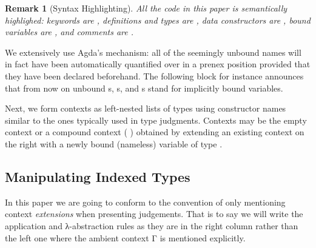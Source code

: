 \documentclass{article}
\newtheorem*{remark}{Remark}
\begin{document}

\begin{remark}[Syntax Highlighting]
  All the code in this paper is semantically highlighed:
  keywords are , definitions and types are ,
  data constructors are , bound variables are
  , and comments are .
\end{remark}

We extensively use Agda's  mechanism: all of
the seemingly unbound names will in fact have been automatically
quantified over in a prenex position provided that they
have been declared beforehand.
%
The following block for instance announces that from now
on unbound s, s, and s stand for implicitly bound
 variables.


Next, we form contexts as left-nested lists of types using
constructor names similar to the ones typically used in
type judgments.
Contexts may be the empty context 
or a compound context ( \AIC{,} ) obtained
by extending an existing context  on the right
with a newly bound (nameless) variable of type .


\subsection{Manipulating Indexed Types}

In this paper we are going to conform to the convention
of only mentioning context \emph{extensions} when
presenting judgements.
%
That is to say we will write the application and
λ-abstraction rules as they are in the right column
rather than the left one where the ambient context Γ
is mentioned explicitly.

\noindent
\begin{minipage}{.4\textwidth}
\end{minipage}\hfill
\begin{minipage}{.4\textwidth}
\end{minipage}
\end{document}
